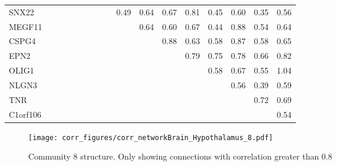 \begin{longtable}{lrrrrrrrrrrrrrrrr}
SNX22    &             &              &            &              &              &             &             &             &         0.49 &        0.64 &       0.67 &        0.81 &        0.45 &      0.60 &           0.35 &        0.56 \\
MEGF11   &             &              &            &              &              &             &             &             &              &        0.64 &       0.60 &        0.67 &        0.44 &      0.88 &           0.54 &        0.64 \\
CSPG4    &             &              &            &              &              &             &             &             &              &             &       0.88 &        0.63 &        0.58 &      0.87 &           0.58 &        0.65 \\
EPN2     &             &              &            &              &              &             &             &             &              &             &            &        0.79 &        0.75 &      0.78 &           0.66 &        0.82 \\
OLIG1    &             &              &            &              &              &             &             &             &              &             &            &             &        0.58 &      0.67 &           0.55 &        1.04 \\
NLGN3    &             &              &            &              &              &             &             &             &              &             &            &             &             &      0.56 &           0.39 &        0.59 \\
TNR      &             &              &            &              &              &             &             &             &              &             &            &             &             &           &           0.72 &        0.69 \\
C1orf106 &             &              &            &              &              &             &             &             &              &             &            &             &             &           &                &        0.54 \\
\end{longtable}


\begin{figure}[h!]
\centering
\texttt{[image: corr\_figures/corr\_networkBrain\_Hypothalamus\_8.pdf]}
\caption{Community 8 structure. Only showing connections with correlation greater than 0.8}
\end{figure}




